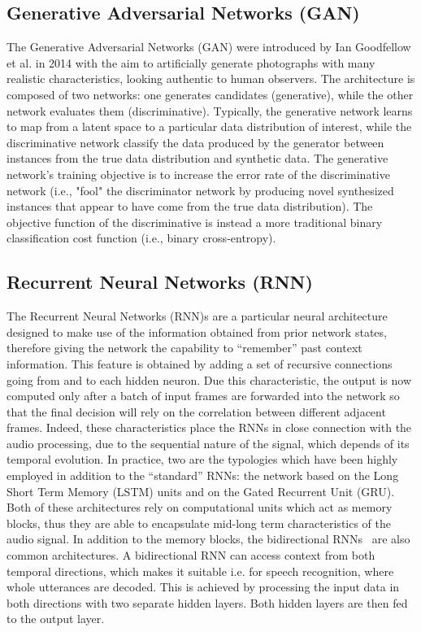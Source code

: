 \subsection{Generative Adversarial Networks (GAN)}
\label{ssec:GAN}
The Generative Adversarial Networks (GAN) were introduced by Ian Goodfellow et al. in 2014 \cite{goodfellow2014generative} with the aim to artificially generate photographs with many realistic characteristics, looking authentic to human observers. The architecture is composed of two networks: one generates candidates (generative), while the other network evaluates them (discriminative). Typically, the generative network learns to map from a latent space to a particular data distribution of interest, while the discriminative network classify the data produced by the generator between instances from the true data distribution and synthetic data. The generative network's training objective is to increase the error rate of the discriminative network (i.e., "fool" the discriminator network by producing novel synthesized instances that appear to have come from the true data distribution). The objective function of the discriminative is instead a more traditional binary classification cost function (i.e., binary cross-entropy). 



\subsection{Recurrent Neural Networks (RNN)}

The Recurrent Neural Networks (RNN)s are a particular neural architecture designed to make use of the information obtained from prior network states, therefore giving the network the capability to ``remember'' past context information. This feature is obtained by adding a set of recursive connections going from and to each hidden neuron. Due this characteristic, the output is now computed only after a batch of input frames are forwarded into the network so that the final decision will rely on the correlation between different adjacent frames. Indeed, these characteristics place the RNNs in close connection with the audio processing, due to the sequential nature of the signal, which depends of its temporal evolution.
In practice, two are the typologies which have been highly employed in addition to the ``standard'' RNNs: the network based on the Long Short Term Memory (LSTM) units and on the Gated Recurrent Unit (GRU). Both of these architectures rely on computational units which act as memory blocks, thus they are able to encapsulate mid-long term characteristics of the audio signal.
In addition to the memory blocks, the bidirectional RNNs~\cite{schuster1997bidirectional} are also common architectures.
A bidirectional RNN can access context from both temporal directions, which makes it suitable i.e. for speech recognition, where whole utterances are decoded. This is achieved by processing the input data in both directions with two separate hidden layers.
Both hidden layers are then fed to the output layer.

